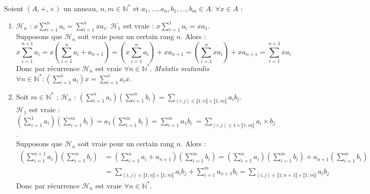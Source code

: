 \documentclass[12pt,a4paper]{report}
\begin{document}
    \begin{demo}[Démonstrations]
    Soient $(A, +, \times)$ un anneau, $n, m \in \mathbb{N}^*$ et $a_1, ..., a_n, b_1, ..., b_m \in A$. $\forall x \in A$ :
    \begin{enumerate}[label=\bfseries\arabic*)]
        \item $\mathcal{H}_n$ : $\displaystyle x \sum_{i = 1}^n a_i = \sum_{i = 1}^n x a_i$. $\mathcal{H}_1$ est vraie : $\displaystyle x \sum_{i = 1}^1 a_i = xa_1$.\\
        Supposons que $\mathcal{H}_n$ soit vraie pour un certain rang $n$. Alors :
        $$ \displaystyle x \sum_{i = 1}^{n+1} a_i = x \left(\sum_{i = 1}^n a_i + a_{n+1} \right) = \left(x \sum_{i = 1}^n a_i \right) + x a_{n+1} = \left(\sum_{i = 1}^n x a_i \right) + x a_{n+1} = \sum_{i = 1}^{n + 1} x a_i $$
        Donc par récurrence $\mathcal{H}_n$ est vraie $\forall n \in \mathbb{N}^*$. \textit{Mutatis mutandis} $\forall n \in \mathbb{N}^* : \displaystyle \left(\sum_{i = 1}^n a_i\right) x = \sum_{i = 1}^n a_i x$.
        \item Soit $m \in \mathbb{N}^*$ ; $\mathcal{H}_n$ : $\displaystyle \left(\sum_{i = 1}^n a_i\right) \left(\sum_{i = 1}^m b_i\right) = \sum_{(i, j) \in \llbracket 1 ; n \rrbracket \times \llbracket 1 ; m \rrbracket} a_i b_j$.\\
         $\mathcal{H}_1$ est vraie : $\displaystyle \left(\sum_{i = 1}^1 a_i\right) \left(\sum_{i = 1}^m b_i\right) = a_1 \left(\sum_{i = 1}^m b_i\right) = \sum_{i = 1}^m a_1b_i\ = \sum_{(i, j) \in {1} \times \llbracket 1 ; m \rrbracket} a_i \times b_j$. \\
         Supposons que $\mathcal{H}_n$ soit vraie pour un certain rang $n$. Alors :
         \begin{align*}
             \left(\sum_{i = 1}^{n+1} a_i\right) \left(\sum_{i = 1}^m b_i\right) &= \left(\sum_{i = 1}^n a_i + a_{n + 1}\right) \left(\sum_{i = 1}^m b_i\right) =  \left(\sum_{i = 1}^n a_i\right) \left(\sum_{i = 1}^m b_i\right) + a_{n+1} \left(\sum_{i = 1}^m b_i\right) \\
             & = \sum_{(i, j) \in \llbracket 1 ; n \rrbracket \times \llbracket 1 ; m \rrbracket} a_i b_j + \sum_{i = 1}^m a_{n+1}b_i = \sum_{(i, j) \in \llbracket 1 ; n+1 \rrbracket \times \llbracket 1 ; m \rrbracket} a_i b_j
         \end{align*}
         Donc par récurrence $\mathcal{H}_n$ est vraie $\forall n \in \mathbb{N}^*$.
    \end{enumerate}
    \end{demo}
    
\end{document}
